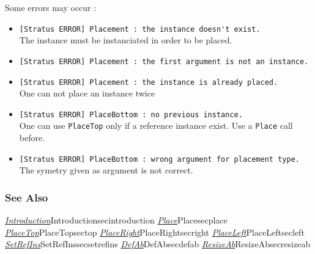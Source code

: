 Some errors may occur :    
\begin{itemize}
    \item \verb-[Stratus ERROR] Placement : the instance doesn't exist.-\\The instance must be instanciated in order to be placed.
    \item \verb-[Stratus ERROR] Placement : the first argument is not an instance.-
    \item \verb-[Stratus ERROR] Placement : the instance is already placed.-\\One can not place an instance twice    
    \item \verb-[Stratus ERROR] PlaceBottom : no previous instance.-\\One can use \verb-PlaceTop- only if a reference instance exist. Use a \verb-Place- call before. 
    \item \verb-[Stratus ERROR] PlaceBottom : wrong argument for placement type.-\\The symetry given as argument is not correct.
\end{itemize}

\subsubsection{See Also}

\hyperref[ref]{\emph{Introduction}}{}{Introduction}{secintroduction}
\hyperref[ref]{\emph{Place}}{}{Place}{secplace}
\hyperref[ref]{\emph{PlaceTop}}{}{PlaceTop}{sectop}
\hyperref[ref]{\emph{PlaceRight}}{}{PlaceRight}{secright}
\hyperref[ref]{\emph{PlaceLeft}}{}{PlaceLeft}{secleft}
\hyperref[ref]{\emph{SetRefIns}}{}{SetRefIns}{secsetrefins}
\hyperref[ref]{\emph{DefAb}}{}{DefAb}{secdefab}
\hyperref[ref]{\emph{ResizeAb}}{}{ResizeAb}{secresizeab}

